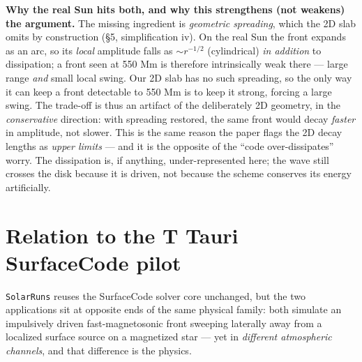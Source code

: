\documentclass[11pt,a4paper]{article}
\begin{document}
\medskip\noindent\textbf{Why the real Sun hits both, and why this strengthens (not weakens)
the argument.} The missing ingredient is \emph{geometric spreading}, which the 2D slab
omits by construction (\S5, simplification iv). On the real Sun the front expands as an
arc, so its \emph{local} amplitude falls as $\sim r^{-1/2}$ (cylindrical) \emph{in addition}
to dissipation; a front seen at 550 Mm is therefore intrinsically weak there --- large
range \emph{and} small local swing. Our 2D slab has no such spreading, so the only way it
can keep a front detectable to 550 Mm is to keep it strong, forcing a large swing. The
trade-off is thus an artifact of the deliberately 2D geometry, in the \emph{conservative}
direction: with spreading restored, the same front would decay \emph{faster} in amplitude,
not slower. This is the same reason the paper flags the 2D decay lengths as \emph{upper
limits} --- and it is the opposite of the ``code over-dissipates'' worry. The dissipation
is, if anything, under-represented here; the wave still crosses the disk because it is
driven, not because the scheme conserves its energy artificially.

\section{Relation to the T Tauri SurfaceCode pilot}

\texttt{SolarRuns} reuses the SurfaceCode solver core unchanged, but the two applications
sit at opposite ends of the same physical family: both simulate an impulsively driven
fast-magnetosonic front sweeping laterally away from a localized surface source on a
magnetized star --- yet in \emph{different atmospheric channels}, and that difference is
the physics.
\end{document}
